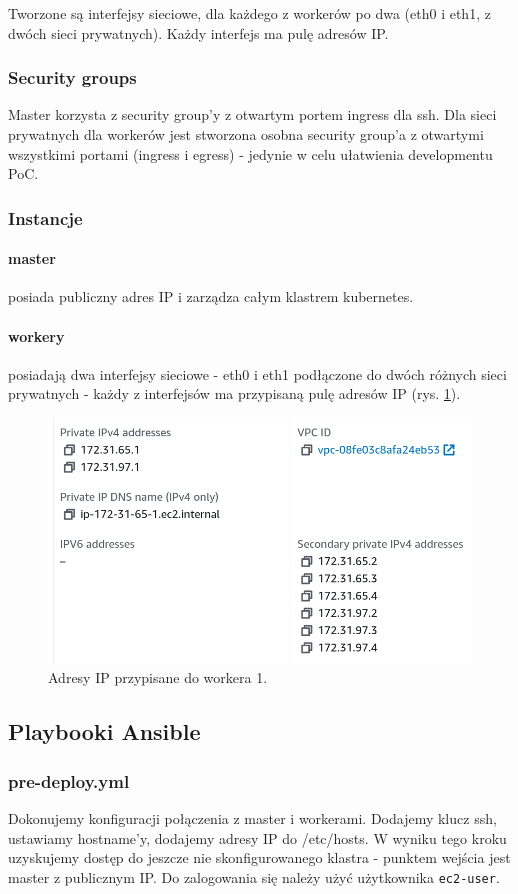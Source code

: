 \documentclass[onecolumn,12pt]{article}
\begin{document}
Tworzone są interfejsy sieciowe, dla każdego z workerów po dwa (eth0 i eth1, z dwóch sieci prywatnych).
Każdy interfejs ma pulę adresów IP.

\subsubsection{Security groups}
Master korzysta z security group'y z otwartym portem ingress dla ssh.
Dla sieci prywatnych dla workerów jest stworzona osobna security group'a z otwartymi wszystkimi portami (ingress i egress) - jedynie w celu ułatwienia developmentu PoC.

\subsubsection{Instancje}
\paragraph{master} posiada publiczny adres IP i zarządza całym klastrem kubernetes.
\paragraph{workery} posiadają dwa interfejsy sieciowe - eth0 i eth1 podłączone do dwóch różnych sieci prywatnych - każdy z interfejsów ma przypisaną pulę adresów IP (rys. \ref{fig:worker1-ips}).

\begin{figure}[!htpb]
    \centering
    \includegraphics[width=0.6\linewidth]{imgs/aws-console-ifs.png}
    \caption{Adresy IP przypisane do workera 1.}
    \label{fig:worker1-ips}
\end{figure}

\subsection{Playbooki Ansible}
\subsubsection{pre-deploy.yml}
Dokonujemy konfiguracji połączenia z master i workerami.
Dodajemy klucz ssh, ustawiamy hostname'y, dodajemy adresy IP do /etc/hosts.
W wyniku tego kroku uzyskujemy dostęp do jeszcze nie skonfigurowanego klastra - punktem wejścia jest master z publicznym IP. Do zalogowania się należy użyć użytkownika \texttt{ec2-user}.
\end{document}
